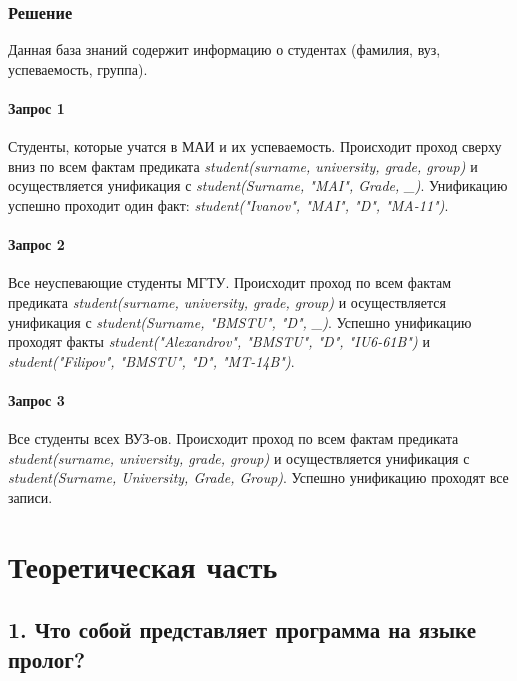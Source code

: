 \documentclass[12pt]{report}
\begin{document}
\subsection*{Решение}

Данная база знаний содержит информацию о студентах (фамилия, вуз, успеваемость, группа).\\

\subsubsection*{Запрос 1}
Студенты, которые учатся в МАИ и их успеваемость. Происходит проход сверху вниз по всем фактам предиката \emph{student(surname, university, grade, group)} и осуществляется унификация с \emph{student(Surname, "MAI"{}, Grade, \_)}. Унификацию успешно проходит один факт: \emph{student("Ivanov"{}, "MAI"{}, "D"{}, "MA-11"{})}.\\

\subsubsection*{Запрос 2}
Все неуспевающие студенты МГТУ. Происходит проход по всем фактам предиката \emph{student(surname, university, grade, group)} и осуществляется унификация с \emph{student(Surname, "BMSTU"{}, "D"{}, \_)}.  Успешно унификацию проходят факты \emph{student("Alexandrov"{}, "BMSTU"{}, "D"{}, "IU6-61B"{})} и \emph{student("Filipov"{}, "BMSTU"{}, "D"{}, "MT-14B"{})}.\\

\subsubsection*{Запрос 3}
Все студенты всех ВУЗ-ов.  Происходит проход по всем фактам предиката \emph{student(surname, university, grade, group)} и осуществляется унификация с \emph{student(Surname, University, Grade, Group)}.  Успешно унификацию проходят все записи.\\


\chapter*{Теоретическая часть}

\section*{1. Что собой представляет программа на языке пролог?}
\end{document}
